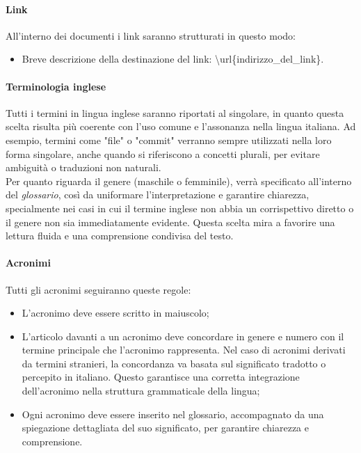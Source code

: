         \paragraph{Link}
        All'interno dei documenti i link saranno strutturati in questo modo:
        \begin{itemize}
            \item Breve descrizione della destinazione del link: \textbackslash url\{indirizzo\_del\_link\}.
        \end{itemize}
        \paragraph{Terminologia inglese}    
        Tutti i termini in lingua inglese saranno riportati al singolare, in quanto questa scelta risulta più coerente con l'uso comune e l'assonanza nella lingua italiana. Ad esempio, termini come "file" o "commit" verranno sempre utilizzati nella loro forma singolare, anche quando si riferiscono a concetti plurali, per evitare ambiguità o traduzioni non naturali.\\
        Per quanto riguarda il genere (maschile o femminile), verrà specificato all'interno del \textit{glossario}, così da uniformare l'interpretazione e garantire chiarezza, specialmente nei casi in cui il termine inglese non abbia un corrispettivo diretto o il genere non sia immediatamente evidente. Questa scelta mira a favorire una lettura fluida e una comprensione condivisa del testo.
        \paragraph{Acronimi} 
        Tutti gli acronimi seguiranno queste regole:
        \begin{itemize}
            \item L'acronimo deve essere scritto in maiuscolo;
            \item L'articolo davanti a un acronimo deve concordare in genere e numero con il termine principale che l'acronimo rappresenta. Nel caso di acronimi derivati da termini stranieri, la concordanza va basata sul significato tradotto o percepito in italiano. Questo garantisce una corretta integrazione dell'acronimo nella struttura grammaticale della lingua;
            \item Ogni acronimo deve essere inserito nel glossario, accompagnato da una spiegazione dettagliata del suo significato, per garantire chiarezza e comprensione.
        \end{itemize}
